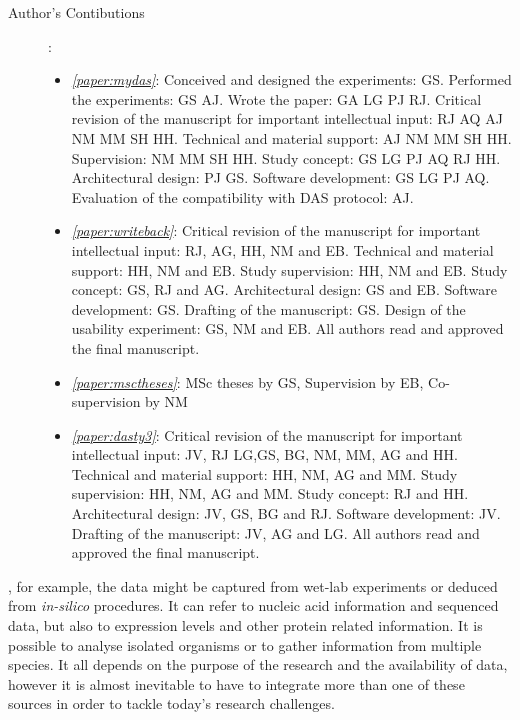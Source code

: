 \begin{description}
	\item[Author's Contibutions]:\\
		\begin{itemize}
			\item \emph{\ref{paper:mydas}}: Conceived and designed the experiments: GS. Performed the experiments: GS AJ. Wrote the paper: GA LG PJ RJ. Critical revision of the manuscript for important intellectual input: RJ AQ AJ NM MM SH HH. Technical and material support: AJ NM MM SH HH. Supervision: NM MM SH HH. Study concept: GS LG PJ AQ RJ HH. Architectural design: PJ GS. Software development: GS LG PJ AQ. Evaluation of the compatibility with DAS protocol: AJ.
			\item \emph{\ref{paper:writeback}}: Critical revision of the manuscript for important intellectual input: RJ, AG, HH, NM and EB. Technical and material support: HH, NM and EB. Study supervision: HH, NM and EB. Study concept: GS, RJ and AG. Architectural design: GS and EB. Software development: GS. Drafting of the manuscript: GS. Design of the usability experiment: GS, NM and EB. All authors read and approved the final manuscript.
			\item \emph{\ref{paper:msctheses}}: MSc theses by GS, Supervision by EB, Co-supervision by NM
			\item \emph{\ref{paper:dasty3}}: Critical revision of the manuscript for important intellectual input: JV, RJ LG,GS, BG, NM, MM, AG and HH. Technical and material support: HH, NM, AG and MM. Study supervision: HH, NM, AG and MM. Study concept:  RJ and HH. Architectural design: JV, GS, BG and RJ. Software development: JV. Drafting of the manuscript: JV, AG and LG. All authors read and approved the final manuscript.
		\end{itemize}
\end{description}
\newpage

, for example, the data might be captured from wet-lab experiments or deduced from \emph{in-silico} procedures. It can refer to nucleic acid information and sequenced data, but also to expression levels and other protein related information. It is possible to analyse isolated organisms or to gather information from multiple species. It all depends on the purpose of the research and the availability of data, however it is almost inevitable to have to integrate more than one of these sources in order to tackle today's research challenges.

